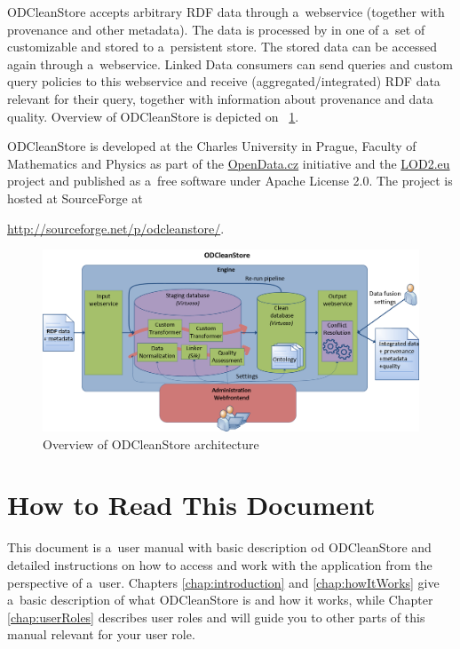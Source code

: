 ODCleanStore accepts arbitrary RDF data through a~webservice (together with provenance and other metadata). The data is processed by  in one of a~set of customizable  and stored to a~persistent store. The stored data can be accessed again through a~webservice. Linked Data consumers can send queries and custom query policies to this webservice and receive (aggregated/integrated) RDF data relevant for their query, together with information about provenance and data quality. Overview of ODCleanStore is depicted on \figurename~\ref{fig:odcsInternal}.

ODCleanStore is developed at the Charles University in Prague, Faculty of Mathematics and Physics as part of the \href{http://opendata.cz}{OpenData.cz} initiative and the \href{http://lod2.eu}{LOD2.eu} project and published as a~free software under Apache License 2.0. The project is hosted at SourceForge at
\begin{center}
  \url{http://sourceforge.net/p/odcleanstore/}.
\end{center}

\begin{figure}[htb]
    \centering
    \includegraphics[width=\textwidth]{images/odcs-internal.png}
    \caption{Overview of ODCleanStore architecture}
	\label{fig:odcsInternal}
\end{figure}

\section{How to Read This Document}

This document is a~user manual with basic description od ODCleanStore and detailed instructions on how to access and work with the application from the perspective of a~user. Chapters \ref{chap:introduction} and \ref{chap:howItWorks} give a~basic description of what ODCleanStore is and how it works, while Chapter \ref{chap:userRoles} describes user roles and will guide you to other parts of this manual relevant for your user role.

